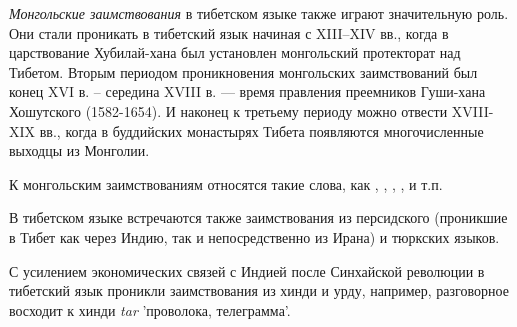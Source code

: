 \emph{Монгольские заимствования} в тибетском языке также играют значительную роль. Они стали проникать в тибетский язык начиная с XIII--XIV вв., когда в царствование Хубилай-хана был установлен монгольский протекторат над Тибетом. Вторым периодом проникновения монгольских заимствований был конец XVI в. -- середина XVIII в. --- время правления преемников Гуши-хана Хошутского (1582-1654). И наконец к третьему периоду можно отвести XVIII-XIX вв., когда в буддийских монастырях Тибета появляются многочисленные выходцы из Монголии.

К монгольским заимствованиям относятся такие слова, как	, , , ,  и т.п.

В тибетском языке встречаются также заимствования из персидского (проникшие в Тибет как через Индию, так и непосредственно из Ирана) и тюркских языков.

С усилением экономических связей с Индией после Синхайской революции в тибетский язык проникли заимствования из хинди и урду, например, разговорное  восходит к хинди \textit{tar} 'проволока, телеграмма'.
